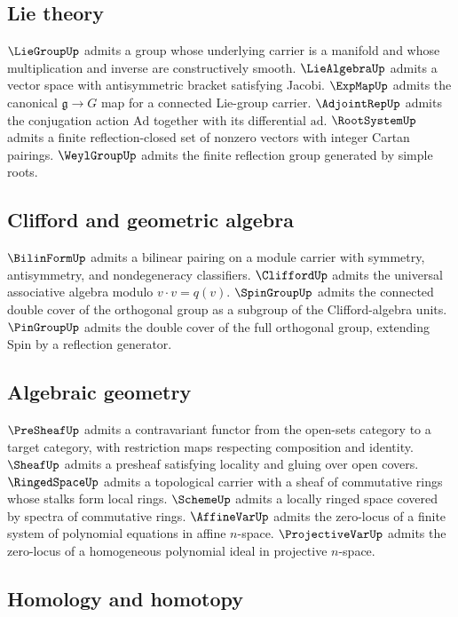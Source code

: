 \subsection*{Lie theory}

$\LieGroupUp$ admits a group whose underlying carrier is a manifold and whose multiplication and inverse are constructively smooth. $\LieAlgebraUp$ admits a vector space with antisymmetric bracket satisfying Jacobi. $\ExpMapUp$ admits the canonical $\mathfrak{g} \to G$ map for a connected Lie-group carrier. $\AdjointRepUp$ admits the conjugation action $\mathrm{Ad}$ together with its differential $\mathrm{ad}$. $\RootSystemUp$ admits a finite reflection-closed set of nonzero vectors with integer Cartan pairings. $\WeylGroupUp$ admits the finite reflection group generated by simple roots.

\subsection*{Clifford and geometric algebra}

$\BilinFormUp$ admits a bilinear pairing on a module carrier with symmetry, antisymmetry, and nondegeneracy classifiers. $\CliffordUp$ admits the universal associative algebra modulo $v \cdot v = q(v)$. $\SpinGroupUp$ admits the connected double cover of the orthogonal group as a subgroup of the Clifford-algebra units. $\PinGroupUp$ admits the double cover of the full orthogonal group, extending Spin by a reflection generator.

\subsection*{Algebraic geometry}

$\PreSheafUp$ admits a contravariant functor from the open-sets category to a target category, with restriction maps respecting composition and identity. $\SheafUp$ admits a presheaf satisfying locality and gluing over open covers. $\RingedSpaceUp$ admits a topological carrier with a sheaf of commutative rings whose stalks form local rings. $\SchemeUp$ admits a locally ringed space covered by spectra of commutative rings. $\AffineVarUp$ admits the zero-locus of a finite system of polynomial equations in affine $n$-space. $\ProjectiveVarUp$ admits the zero-locus of a homogeneous polynomial ideal in projective $n$-space.

\subsection*{Homology and homotopy}


